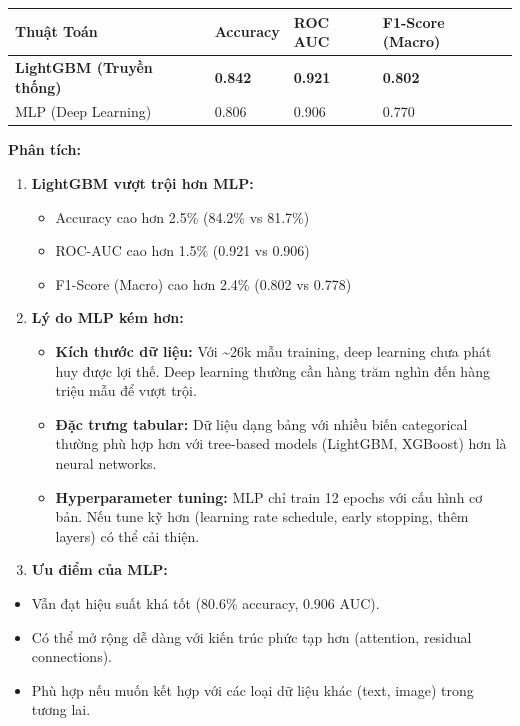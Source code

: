 \documentclass[
]{article}
\newcounter{none} %
\providecommand{\tightlist}{%
  \setlength{\itemsep}{0pt}\setlength{\parskip}{0pt}}
\begin{document}
{\def\LTcaptype{none} %
\begin{longtable}[]{@{}llll@{}}
\toprule\noalign{}
Thuật Toán & Accuracy & ROC AUC & F1-Score (Macro) \\
\midrule\noalign{}
\endhead
\bottomrule\noalign{}
\endlastfoot
\textbf{LightGBM (Truyền thống)} & \textbf{0.842} & \textbf{0.921} &
\textbf{0.802} \\
MLP (Deep Learning) & 0.806 & 0.906 & 0.770 \\
\end{longtable}
}

\textbf{Phân tích:}

\begin{enumerate}
\def\labelenumi{\arabic{enumi}.}
\item
  \textbf{LightGBM vượt trội hơn MLP:}

  \begin{itemize}
  \tightlist
  \item
    Accuracy cao hơn 2.5\% (84.2\% vs 81.7\%)
  \item
    ROC-AUC cao hơn 1.5\% (0.921 vs 0.906)
  \item
    F1-Score (Macro) cao hơn 2.4\% (0.802 vs 0.778)
  \end{itemize}
\item
  \textbf{Lý do MLP kém hơn:}

  \begin{itemize}
  \tightlist
  \item
    \textbf{Kích thước dữ liệu:} Với \textasciitilde26k mẫu training,
    deep learning chưa phát huy được lợi thế. Deep learning thường cần
    hàng trăm nghìn đến hàng triệu mẫu để vượt trội.
  \item
    \textbf{Đặc trưng tabular:} Dữ liệu dạng bảng với nhiều biến
    categorical thường phù hợp hơn với tree-based models (LightGBM,
    XGBoost) hơn là neural networks.
  \item
    \textbf{Hyperparameter tuning:} MLP chỉ train 12 epochs với cấu hình
    cơ bản. Nếu tune kỹ hơn (learning rate schedule, early stopping,
    thêm layers) có thể cải thiện.
  \end{itemize}
\item
  \textbf{Ưu điểm của MLP:}
\end{enumerate}

\begin{itemize}
\tightlist
\item
  Vẫn đạt hiệu suất khá tốt (80.6\% accuracy, 0.906 AUC).
\item
  Có thể mở rộng dễ dàng với kiến trúc phức tạp hơn (attention, residual
  connections).
\item
  Phù hợp nếu muốn kết hợp với các loại dữ liệu khác (text, image) trong
  tương lai.
\end{itemize}
\end{document}
